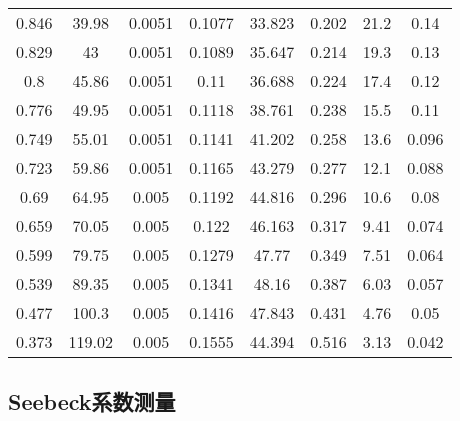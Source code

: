 \documentclass[dvipsnames, svgnames,a4paper,11pt]{article}
\begin{document}
\begin{longtable}{|c|c|c|c|c|c|c|c|}
                    0.846 & 39.98 & 0.0051 & 0.1077 & 33.823 & 0.202 & 21.2 & 0.14 \\
                    0.829 & 43 & 0.0051 & 0.1089 & 35.647 & 0.214 & 19.3 & 0.13 \\
                    0.8   & 45.86 & 0.0051 & 0.11 & 36.688 & 0.224 & 17.4 & 0.12 \\
                    0.776 & 49.95 & 0.0051 & 0.1118 & 38.761 & 0.238 & 15.5 & 0.11 \\
                    0.749 & 55.01 & 0.0051 & 0.1141 & 41.202 & 0.258 & 13.6 & 0.096 \\
                    0.723 & 59.86 & 0.0051 & 0.1165 & 43.279 & 0.277 & 12.1 & 0.088 \\
                    0.69  & 64.95 & 0.005 & 0.1192 & 44.816 & 0.296 & 10.6 & 0.08 \\
                    0.659 & 70.05 & 0.005 & 0.122 & 46.163 & 0.317 & 9.41 & 0.074 \\
                    0.599 & 79.75 & 0.005 & 0.1279 & 47.77 & 0.349 & 7.51 & 0.064 \\
                    0.539 & 89.35 & 0.005 & 0.1341 & 48.16 & 0.387 & 6.03 & 0.057 \\
                    0.477 & 100.3 & 0.005 & 0.1416 & 47.843 & 0.431 & 4.76 & 0.05 \\
                    0.373 & 119.02 & 0.005 & 0.1555 & 44.394 & 0.516 & 3.13 & 0.042 \\
                \end{longtable}



    \subsection{Seebeck系数测量}

        \begin{table}[htbp]
            \centering
            \caption{Seebeck系数测量数据}
            \label{tbl:Seebeck系数测量数据}
        \end{table}
\end{document}
